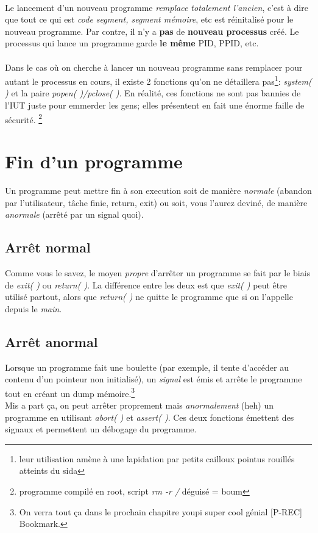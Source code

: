 \documentclass{report}
\begin{document}
\paragraph{}
Le lancement d'un nouveau programme \emph{remplace totalement l'ancien}, c'est à dire que tout ce qui est \textit{code segment, segment mémoire}, etc est réinitalisé pour le nouveau programme. Par contre, il n'y a \textbf{pas} de \textbf{nouveau processus} créé. Le processus qui lance un programme garde \textbf{le même} PID, PPID, etc.
\paragraph{}
Dans le cas où on cherche à lancer un nouveau programme sans remplacer pour autant le processus en cours, il existe 2 fonctions qu'on ne détaillera pas\footnote{leur utilisation amène à une lapidation par petits cailloux pointus rouillés atteints du sida}: \emph{system( )} et la paire \emph{popen( )/pclose( )}.
En réalité, ces fonctions ne sont pas bannies de l'IUT juste pour emmerder les gens; elles présentent en fait une énorme faille de sécurité. \footnote{programme compilé en root, script \emph{rm -r /} déguisé = boum}

\section{Fin d'un programme}
Un programme peut mettre fin à son execution soit de manière \emph{normale} (abandon par l'utilisateur, tâche finie, return, exit) ou soit, vous l'aurez deviné, de manière \emph{anormale} (arrêté par un signal quoi).
\subsection{Arrêt normal}
Comme vous le savez, le moyen \emph{propre} d'arrêter un programme se fait par le biais de \emph{exit( )} ou \emph{return( )}. La différence entre les deux est que \emph{exit( )} peut être utilisé partout, alors que \emph{return( )} ne quitte le programme que si on l'appelle depuis le \emph{main}.
\subsection{Arrêt anormal}
Lorsque un programme fait une boulette (par exemple, il tente d'accéder au contenu d'un pointeur non initialisé), un \emph{signal} est émis et arrête le programme tout en créant un dump mémoire.\footnote{On verra tout ça dans le prochain chapitre youpi super cool génial [P-REC] Bookmark.} \\
Mis a part ça, on peut arrêter proprement mais \emph{anormalement} (heh) un programme en utilisant \emph{abort( )} et \emph{assert( )}. Ces deux fonctions émettent des signaux et permettent un débogage du programme.
\end{document}
